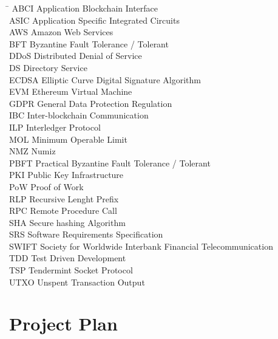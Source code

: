 \documentclass[a4paper,twoside,phd]{BYUPhys}
\begin{document}
\begin{tabbing}
\hspace*{4cm}\= \kill
ABCI \> Application Blockchain Interface\\
ASIC \> Application Specific Integrated Circuits\\
AWS \> Amazon Web Services\\
BFT \> Byzantine Fault Tolerance / Tolerant\\
DDoS \> Distributed Denial of Service\\
DS \> Directory Service\\
ECDSA \> Elliptic Curve Digital Signature Algorithm\\
EVM \> Ethereum Virtual Machine\\
GDPR \> General Data Protection Regulation\\
IBC \> Inter-blockchain Communication\\
ILP \> Interledger Protocol\\
MOL \> Minimum Operable Limit\\
NMZ \> Numiz\\
PBFT \> Practical Byzantine Fault Tolerance / Tolerant\\
PKI \> Public Key Infrastructure\\
PoW \> Proof of Work\\
RLP \> Recursive Lenght Prefix\\
RPC \> Remote Procedure Call\\
SHA \> Secure hashing Algorithm\\
SRS \> Software Requirements Specification\\
SWIFT \> Society for Worldwide Interbank Financial Telecommunication\\
TDD \> Test Driven Development\\
TSP \> Tendermint Socket Protocol\\
UTXO \> Unspent Transaction Output\\
\end{tabbing}


\appendix
\chapter{Project Plan}
\end{document}

